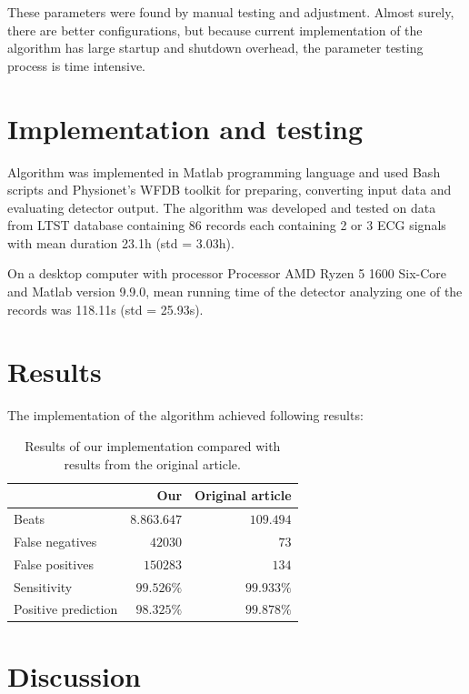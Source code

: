 \documentclass[fleqn,moreauthors,10pt]{ds_report}
\begin{document}
These parameters were found by manual testing and adjustment. Almost surely, there are better configurations, but because current implementation of the algorithm has large startup and shutdown overhead, the parameter testing process is time intensive.

\section*{Implementation and testing}

Algorithm was implemented in Matlab programming language and used Bash scripts and Physionet's WFDB toolkit \cite{wfdb} for preparing, converting input data and evaluating detector output. The algorithm was developed and tested on data from LTST database \cite{ltst} containing 86 records each containing 2 or 3 ECG signals with mean duration 23.1h (std = 3.03h).

On a desktop computer with processor Processor AMD Ryzen 5 1600 Six-Core and Matlab version 9.9.0, mean running time of the detector analyzing one of the records was 118.11s (std = 25.93s).

\section*{Results}

The implementation of the algorithm achieved following results:

\begin{table}[hbt]
	\caption{Results of our implementation compared with results from the original article.}
	\centering
	\begin{tabular}{l | r r}
		\toprule
		                    & Our & Original article \\
		\midrule
		Beats				        & $8.863.647$ & $109.494$ \\
		False negatives     & $42030$			& $73$ \\
		False positives	    & $150283$		& $134$ \\
		Sensitivity 		    & $99.526\%$  & $99.933\%$ \\
		Positive prediction & $98.325\%$  & $99.878\%$ \\
		\bottomrule
	\end{tabular}
	\label{tab:label}
\end{table}

\section*{Discussion}
\end{document}
